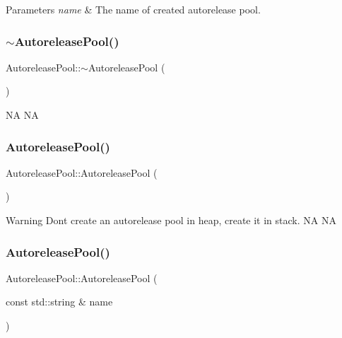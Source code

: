 \begin{DoxyParams}{Parameters}
{\em name} & The name of created autorelease pool. \\
\hline
\end{DoxyParams}
\mbox{\label{classAutoreleasePool_ab44bff785343ae6d16dc67b9f4812079}} 
\subsubsection{\texorpdfstring{$\sim$\+Autorelease\+Pool()}{~AutoreleasePool()}\hspace{0.1cm}{\footnotesize\ttfamily [1/2]}}
{\footnotesize\ttfamily Autorelease\+Pool\+::$\sim$\+Autorelease\+Pool (\begin{DoxyParamCaption}{ }\end{DoxyParamCaption})}

NA  NA \mbox{\label{classAutoreleasePool_af8cd9f894ff35d9ae149bb13eb495545}} 
\subsubsection{\texorpdfstring{Autorelease\+Pool()}{AutoreleasePool()}\hspace{0.1cm}{\footnotesize\ttfamily [3/4]}}
{\footnotesize\ttfamily Autorelease\+Pool\+::\+Autorelease\+Pool (\begin{DoxyParamCaption}{ }\end{DoxyParamCaption})}

\begin{DoxyWarning}{Warning}
Don\textquotesingle{}t create an autorelease pool in heap, create it in stack.  NA  NA 
\end{DoxyWarning}
\mbox{\label{classAutoreleasePool_ac294293fe0029e3d494f95f1a8bb02d8}} 
\subsubsection{\texorpdfstring{Autorelease\+Pool()}{AutoreleasePool()}\hspace{0.1cm}{\footnotesize\ttfamily [4/4]}}
{\footnotesize\ttfamily Autorelease\+Pool\+::\+Autorelease\+Pool (\begin{DoxyParamCaption}\item[{const std\+::string \&}]{name }\end{DoxyParamCaption})}

